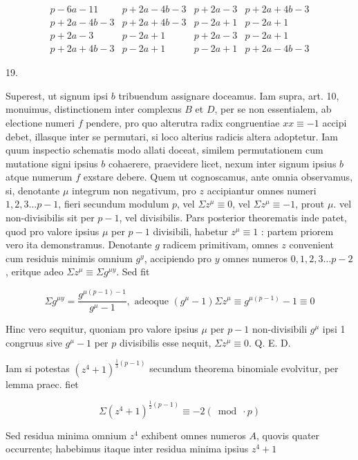 \documentclass[10pt]{article}
\begin{document}
\[
\begin{array}{l|l|l|l}
p-6 a-11 & p+2 a-4 b-3 & p+2 a-3 & p+2 a+4 b-3 \\
p+2 a-4 b-3 & p+2 a+4 b-3 & p-2 a+1 & p-2 a+1 \\
p+2 a-3 & p-2 a+1 & p+2 a-3 & p-2 a+1 \\
p+2 a+4 b-3 & p-2 a+1 & p-2 a+1 & p+2 a-4 b-3
\end{array}
\]

19.

Superest, ut signum ipsi \(b\) tribuendum assignare doceamus. Iam supra, art. 10, monuimus, distinctionem inter complexus \(B\) et \(D\), per se non essentialem, ab electione numeri \(f\) pendere, pro quo alterutra radix congruentiae \(x x \equiv-1\) accipi debet, illasque inter se permutari, si loco alterius radicis altera adoptetur. Iam quum inspectio schematis modo allati doceat, similem permutationem cum mutatione signi ipsius \(b\) cohaerere, praevidere licet, nexum inter signum ipsius \(b\) atque numerum \(f\) exstare debere. Quem ut cognoscamus, ante omnia observamus, si, denotante \(\mu\) integrum non negativum, pro \(z\) accipiantur omnes numeri \(1,2,3 \ldots p-1\), fieri secundum modulum \(p\), vel \(\Sigma z^{\mu} \equiv 0\), vel \(\Sigma z^{\mu} \equiv-1\), prout \(\mu\). vel non-divisibilis sit per \(p-1\), vel divisibilis. Pars posterior theorematis inde patet, quod pro valore ipsius \(\mu\) per \(p-1\) divisibili, habetur \(z^{\mu} \equiv 1\) : partem priorem vero ita demonstramus. Denotante \(g\) radicem primitivam, omnes \(z\) convenient cum residuis minimis omnium \(g^{y}\), accipiendo pro \(y\) omnes numeros \(0,1,2,3 \ldots p-2\), eritque adeo \(\Sigma z^{\mu} \equiv \Sigma g^{\mu y}\). Sed fit

\[
\Sigma g^{\mu y}=\frac{g^{\mu(p-1)-1}}{g^{\mu}-1}, \text { adeoque }\left(g^{\mu}-1\right) \Sigma z^{\mu} \equiv g^{\mu(p-1)}-1 \equiv 0
\]

Hinc vero sequitur, quoniam pro valore ipsius \(\mu\) per \(p-1\) non-divisibili \(g^{\mu}\) ipsi 1 congruus sive \(g^{\mu}-1\) per \(p\) divisibilis esse nequit, \(\Sigma z^{\mu} \equiv 0\). Q. E. D.

Iam si potestas \(\left(z^{4}+1\right)^{\frac{1}{3}(p-1)}\) secundum theorema binomiale evolvitur, per lemma praec. fiet

\[
\Sigma\left(z^{4}+1\right)^{\frac{1}{2}(p-1)} \equiv-2(\bmod \cdot p)
\]

Sed residua minima omnium \(z^{4}\) exhibent omnes numeros \(A\), quovis quater occurrente; habebimus itaque inter residua minima ipsius \(z^{4}+1\)
\end{document}
